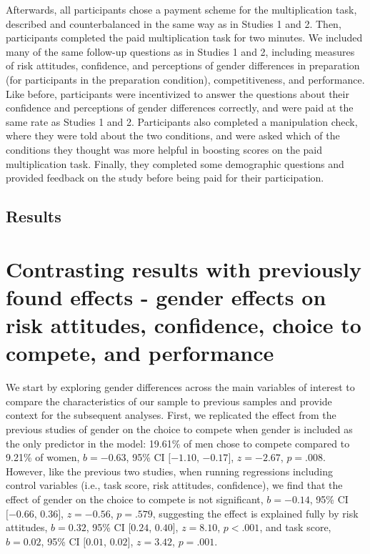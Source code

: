 \documentclass[a4paper, nobind]{templates/ociamthesis}
\begin{document}
Afterwards, all participants chose a payment scheme for the multiplication task, described and counterbalanced in the same way as in Studies 1 and 2. Then, participants completed the paid multiplication task for two minutes. We included many of the same follow-up questions as in Studies 1 and 2, including measures of risk attitudes, confidence, and perceptions of gender differences in preparation (for participants in the preparation condition), competitiveness, and performance. Like before, participants were incentivized to answer the questions about their confidence and perceptions of gender differences correctly, and were paid at the same rate as Studies 1 and 2. Participants also completed a manipulation check, where they were told about the two conditions, and were asked which of the conditions they thought was more helpful in boosting scores on the paid multiplication task. Finally, they completed some demographic questions and provided feedback on the study before being paid for their participation.

\hypertarget{results-2}{%
\subsection{Results}\label{results-2}}

\hypertarget{contrasting-results-with-previously-found-effects---gender-effects-on-risk-attitudes-confidence-choice-to-compete-and-performance}{%
\section{Contrasting results with previously found effects - gender effects on risk attitudes, confidence, choice to compete, and performance}\label{contrasting-results-with-previously-found-effects---gender-effects-on-risk-attitudes-confidence-choice-to-compete-and-performance}}

We start by exploring gender differences across the main variables of interest to compare the characteristics of our sample to previous samples and provide context for the subsequent analyses. First, we replicated the effect from the previous studies of gender on the choice to compete when gender is included as the only predictor in the model: 19.61\% of men chose to compete compared to 9.21\% of women, \(b = -0.63\), 95\% CI \([-1.10\), \(-0.17]\), \(z = -2.67\), \(p = .008\). However, like the previous two studies, when running regressions including control variables (i.e., task score, risk attitudes, confidence), we find that the effect of gender on the choice to compete is not significant, \(b = -0.14\), 95\% CI \([-0.66\), \(0.36]\), \(z = -0.56\), \(p = .579\), suggesting the effect is explained fully by risk attitudes, \(b = 0.32\), 95\% CI \([0.24\), \(0.40]\), \(z = 8.10\), \(p < .001\), and task score, \(b = 0.02\), 95\% CI \([0.01\), \(0.02]\), \(z = 3.42\), \(p = .001\).
\end{document}
